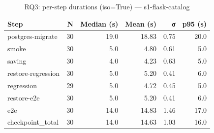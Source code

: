 \begin{table}[htbp]
\centering
\small
\caption{RQ3: per-step durations (iso=True) — s1-flask-catalog}
\label{tab:rq3-s1-flask-catalog-steps}
\begin{tabular}{lrrrrr}
\toprule
\textbf{Step} & \textbf{N} & \textbf{Median (s)} & \textbf{Mean (s)} & \textbf{σ} & \textbf{p95 (s)} \\
\midrule
postgres-migrate & 30 & 19.0 & 18.83 & 0.75 & 20.0 \\
smoke & 30 & 5.0 & 4.80 & 0.61 & 5.0 \\
saving & 30 & 4.0 & 4.23 & 0.63 & 5.0 \\
restore-regression & 30 & 5.0 & 5.20 & 0.41 & 6.0 \\
regression & 29 & 5.0 & 4.72 & 0.45 & 5.0 \\
restore-e2e & 30 & 5.0 & 5.20 & 0.41 & 6.0 \\
e2e & 30 & 14.0 & 14.83 & 1.46 & 17.0 \\
checkpoint_total & 30 & 14.0 & 14.63 & 1.03 & 16.0 \\
\bottomrule
\end{tabular}
\end{table}